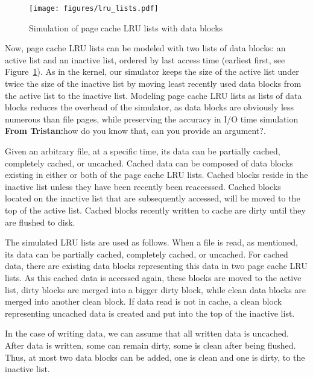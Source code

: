 \documentclass[conference]{IEEEtran}
\newcommand{\tristan}[1]{\color{orange}\textbf{From Tristan:}#1\color{black}}
\begin{document}
			\begin{figure}
   				\centering
   				\texttt{[image: figures/lru\_lists.pdf]}
   				\caption{Simulation of page cache LRU lists with data blocks}	\label{fig:lrulist}
			\end{figure}	
			
			Now, page cache LRU lists can be modeled with two lists of data blocks: 
			an active list and an inactive list, ordered by last access time 
			(earliest first, see Figure~\ref{fig:lrulist}).
			As in the kernel, our simulator keeps the size of the active list under
			twice the size of the inactive list by moving least recently 
            used data blocks from the active list to the inactive list.
			Modeling page cache LRU lists as lists of data blocks reduces the
			overhead of the simulator, as data blocks are obviously less
			numerous than file pages, while preserving the accuracy in I/O time
			simulation \tristan{how do you know that, can you provide an argument?}.
			
			Given an arbitrary file, at a specific time, its data can be partially 
			cached, completely cached, or uncached.
			Cached data can be composed of data blocks existing in either or both
            of the page cache LRU lists. Cached blocks reside in the inactive list
            unless they have been recently been reaccessed. Cached blocks 
            located on the inactive list that are subsequently accessed, 
            will be moved to the top of the active list. Cached blocks 
            recently written to cache are dirty until they are flushed to disk.

            The simulated LRU lists are used as follows. When a file is read, 
            as mentioned, its data can be partially cached, completely cached, 
            or uncached. 
            For cached data, there are existing data blocks representing
			this data in two page cache LRU lists. 
			As this cached data is accessed again, these blocks are moved to 
			the active list, dirty blocks are merged into a bigger dirty block, 
			while clean data blocks are merged into another clean block. 
			If data read is not in cache, a clean block representing uncached data 
			is created and put into the top of the inactive list. 
			
			In the case of writing data, we can assume that all written data 
			is uncached. After data is written, some can remain dirty, some is 
			clean after being flushed. 
			Thus, at most two data blocks can be added, one is clean and one 
			is dirty, to the inactive list.
			
\end{document}
